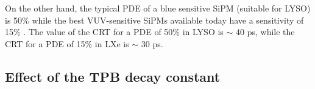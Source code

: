 \documentclass[review]{elsarticle}
\begin{document}
On the other hand, the typical PDE of a blue sensitive SiPM (suitable for LYSO) is 50\% while the best VUV-sensitive SiPMs available today have a sensitivity of 15\% \cite{meg}. The value of the CRT for a PDE of 50\% in LYSO is $\sim$ 40 ps, while
the CRT for a PDE of 15\% in LXe is $\sim$ 30 ps.
  
\subsection*{Effect of the TPB decay constant}
%
%
\end{document}
